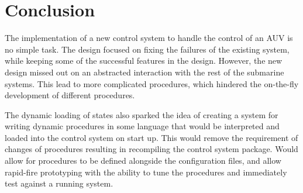 \chapter{Conclusion}

\label{Chapter5}

The implementation of a new control system to handle the control of an AUV is no
simple task.
The design focused on fixing the failures of the existing system, while keeping
some of the successful features in the design.
However, the new design missed out on an abstracted interaction with the rest of
the submarine systems.
This lead to more complicated procedures, which hindered the on-the-fly
development of different procedures.

The dynamic loading of states also sparked the idea of creating a system for
writing dynamic procedures in some language that would be interpreted and loaded
into the control system on start up.
This would remove the requirement of changes of procedures resulting in
recompiling the control system package.
Would allow for procedures to be defined alongside the configuration files, and
allow rapid-fire prototyping with the ability to tune the procedures and
immediately test against a running system.
